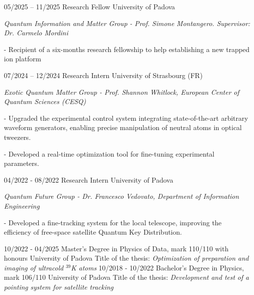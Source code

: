 \documentclass[9pt]{developercv} %
\begin{document}
\begin{entrylist}
	\entry
        {05/2025 -- 11/2025}
		{Research Fellow}
		{University of Padova}
            {\textit{Quantum Information and Matter Group - Prof. Simone Montangero. Supervisor: Dr. Carmelo Mordini}

            - Recipient of a six-months research fellowship to help establishing a new trapped ion platform
            
            }
\end{entrylist}

\begin{entrylist}
	\entry
        {07/2024 -- 12/2024}
		{Research Intern}
		{University of Strasbourg (FR)}
            {\textit{Exotic Quantum Matter Group - Prof. Shannon Whitlock, European Center of Quantum Sciences (CESQ)}

            - Upgraded the experimental control system integrating state-of-the-art arbitrary waveform generators, enabling precise manipulation of neutral atoms in optical tweezers.

            - Developed a real-time optimization tool for fine-tuning experimental parameters.
            }	
\end{entrylist}

\begin{entrylist}
	\entry
        {04/2022 - 08/2022}
		{ Research Intern}
		{University of Padova}
            {\textit{Quantum Future Group - Dr. Francesco Vedovato, Department of Information Engineering}

            - Developed a fine-tracking system for the local telescope, improving the efficiency of free-space satellite Quantum Key Distribution.
            }
\end{entrylist}

\vspace{-10 pt}
\begin{entrylist}
    \entry
		{10/2022 - 04/2025}
		{Master's Degree in Physics of Data, \small{mark 110/110 with honours} }
		{University of Padova}
        {Title of the thesis: \textit{Optimization of preparation and imaging of ultracold $^{39}$K atoms}}
    \entry
		{10/2018 - 10/2022}
		{Bachelor's Degree in Physics, \small{mark 106/110}}
		{University of Padova}
        {Title of the thesis: \textit{Development and test of a pointing system for satellite tracking}}

\end{entrylist}
\end{document}
